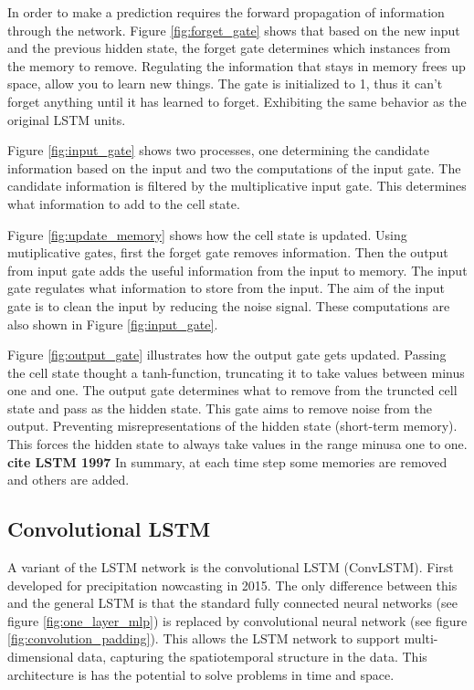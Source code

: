 \documentclass{article}
\begin{document}
In order to make a prediction requires the forward propagation of information through the network. Figure \ref{fig:forget_gate} shows that based on the new input and the previous hidden state, the forget gate determines which instances from the memory to remove. Regulating the information that stays in memory frees up space, allow you to learn new things. The gate is initialized to 1, thus it can't forget anything until it has learned to forget. Exhibiting the same behavior as the original LSTM units. 

Figure \ref{fig:input_gate} shows two processes, one determining the candidate information based on the input and two the computations of the input gate. The candidate information is filtered by the multiplicative input gate. This determines what information to add to the cell state.

Figure \ref{fig:update_memory} shows how the cell state is updated. Using mutiplicative gates, first the forget gate removes information. Then the output from input gate adds the useful information from the input to memory. The input gate regulates what information to store from the input. The aim of the input gate is to clean the input by reducing the noise signal. These computations are also shown in Figure \ref{fig:input_gate}.

Figure \ref{fig:output_gate} illustrates how the output gate gets updated. Passing the cell state thought a tanh-function, truncating it to take values between minus one and one. The output gate determines what to remove from the truncted cell state and pass as the hidden state. This gate aims to remove noise from the output. Preventing misrepresentations of the hidden state (short-term memory). This forces the hidden state to always take values in the range minusa one to one. \textbf{cite LSTM 1997} In summary, at each time step some memories are removed and others are added.  

\subsection{Convolutional LSTM}  \label{sec:convolutional_lstm}
A variant of the LSTM network is the convolutional LSTM (ConvLSTM). First developed for precipitation nowcasting in 2015. The only difference between this and the general LSTM is that the standard fully connected neural networks (see figure \ref{fig:one_layer_mlp}) is replaced by convolutional neural network (see figure \ref{fig:convolution_padding}). This allows the LSTM network to support multi-dimensional data, capturing the spatiotemporal structure in the data. This architecture is has the potential to solve problems in time and space. 
\end{document}
